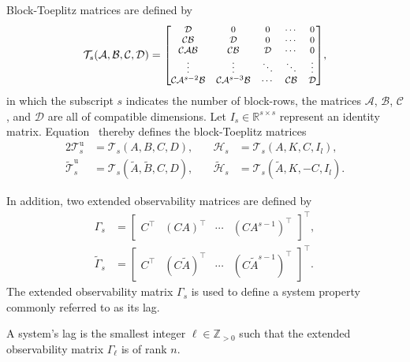 Block-Toeplitz matrices are defined by
\begin{align}\label{eqn:blockToeplitz} 
\mathcal{T}_s(\mathcal{A},\mathcal{B},\mathcal{C},\mathcal{D}) =\scriptsize{
	\begin{bmatrix}
		\mathcal{D}         & 0         & 0      & \cdots  & 0\\
		\mathcal{C}\mathcal{B}        & \mathcal{D}         & 0      & \cdots  & 0\\
		\mathcal{C}\mathcal{A}\mathcal{B}       & \mathcal{C}\mathcal{B}        & \mathcal{D}      & \cdots & 0\\
		\vdots    &  \vdots & \ddots & \ddots & \vdots\\
		\mathcal{C}\mathcal{A}^{s-2}\mathcal{B} & \mathcal{C}\mathcal{A}^{s-3}\mathcal{B} & \cdots  & \mathcal{C}\mathcal{B}     & \mathcal{D}
	\end{bmatrix}},
\end{align}
in which the subscript $s$ indicates the number of block-rows, the matrices $\mathcal{A}$, $\mathcal{B}$, $\mathcal{C}$, and $\mathcal{D}$ are all of compatible dimensions. Let ${I_s\in\mathbb{R}^{s\times s}}$ represent an identity matrix. Equation~ thereby defines the block-Toeplitz matrices
\begin{alignat*}{2}
\mathcal{T}_s^\mathrm{u}&=\mathcal{T}_s(A,B,C,D),\quad  &\mathcal{H}_s&=\mathcal{T}_s(A,K,C,I_l),\\
\widetilde{\mathcal{T}}_s^\mathrm{u}&=\mathcal{T}_s(\tilde{A},\tilde{B},C,D),\quad  &\widetilde{\mathcal{H}}_s&=\mathcal{T}_s(\tilde{A},K,-C,I_l).
\end{alignat*}

In addition, two extended observability matrices are defined by
\begin{align*}
\Gamma_s &= \begin{bmatrix}C^\top & (CA)^\top & \cdots & (CA^{s-1})^\top\end{bmatrix}^\top,\\%
\widetilde{\Gamma}_s &= \begin{bmatrix}C^\top & (C\tilde{A})^\top & \cdots & (C\tilde{A}^{s-1})^\top\end{bmatrix}^\top.
\end{align*}
The extended observability matrix $\Gamma_s$ is used to define a system property commonly referred to as its lag.
\begin{defn}\label{def:lag}
    A system's lag is the smallest integer $\ell\in\mathbb{Z}_{>0}$ such that the extended observability matrix $\Gamma_\ell$ is of rank $n$.
\end{defn}

